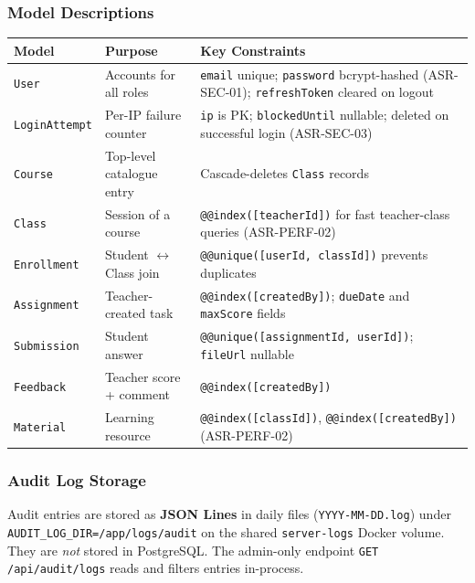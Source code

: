 \documentclass[12pt,a4paper]{article}
\begin{document}
\subsubsection{Model Descriptions}

\begingroup
\small
\begin{longtable}{L{2.5cm} L{4cm} L{7cm}}
  \toprule
  \textbf{Model} & \textbf{Purpose} & \textbf{Key Constraints} \\
  \midrule \endhead \bottomrule \endlastfoot

  \texttt{User}         & Accounts for all roles & \texttt{email} unique; \texttt{password} bcrypt-hashed (ASR-SEC-01); \texttt{refreshToken} cleared on logout \\
  \texttt{LoginAttempt} & Per-IP failure counter & \texttt{ip} is PK; \texttt{blockedUntil} nullable; deleted on successful login (ASR-SEC-03) \\
  \texttt{Course}       & Top-level catalogue entry & Cascade-deletes \texttt{Class} records \\
  \texttt{Class}        & Session of a course & \texttt{@@index([teacherId])} for fast teacher-class queries (ASR-PERF-02) \\
  \texttt{Enrollment}   & Student $\leftrightarrow$ Class join & \texttt{@@unique([userId, classId])} prevents duplicates \\
  \texttt{Assignment}   & Teacher-created task & \texttt{@@index([createdBy])}; \texttt{dueDate} and \texttt{maxScore} fields \\
  \texttt{Submission}   & Student answer & \texttt{@@unique([assignmentId, userId])}; \texttt{fileUrl} nullable \\
  \texttt{Feedback}     & Teacher score + comment & \texttt{@@index([createdBy])} \\
  \texttt{Material}     & Learning resource & \texttt{@@index([classId])}, \texttt{@@index([createdBy])} (ASR-PERF-02) \\
\end{longtable}
\endgroup

\subsubsection{Audit Log Storage}

Audit entries are stored as \textbf{JSON Lines} in daily files
(\texttt{YYYY-MM-DD.log}) under \texttt{AUDIT\_LOG\_DIR=/app/logs/audit}
on the shared \texttt{server-logs} Docker volume. They are \emph{not} stored in PostgreSQL.
The admin-only endpoint \texttt{GET /api/audit/logs} reads and filters entries in-process.
\end{document}
